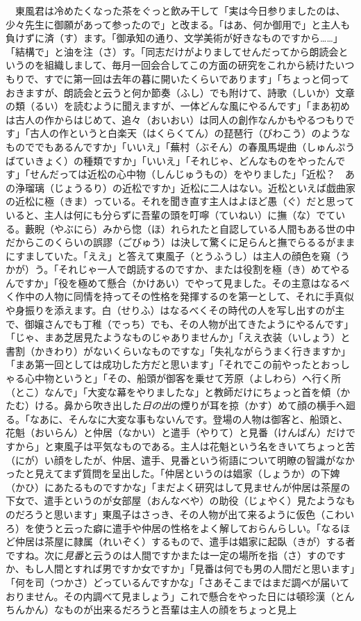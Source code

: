 　東風君は冷めたくなった茶をぐっと飲み干して「実は今日参りましたのは、少々先生に御願があって参ったので」と改まる。「はあ、何か御用で」と主人も負けずに済（す）ます。「御承知の通り、文学美術が好きなものですから\ldots{}\ldots{}」「結構で」と油を注（さ）す。「同志だけがよりましてせんだってから朗読会というのを組織しまして、毎月一回会合してこの方面の研究をこれから続けたいつもりで、すでに第一回は去年の暮に開いたくらいであります」「ちょっと伺っておきますが、朗読会と云うと何か節奏（ふし）でも附けて、詩歌（しいか）文章の類（るい）を読むように聞えますが、一体どんな風にやるんです」「まあ初めは古人の作からはじめて、追々（おいおい）は同人の創作なんかもやるつもりです」「古人の作というと白楽天（はくらくてん）の琵琶行（びわこう）のようなものででもあるんですか」「いいえ」「蕪村（ぶそん）の春風馬堤曲（しゅんぷうばていきょく）の種類ですか」「いいえ」「それじゃ、どんなものをやったんです」「せんだっては近松の心中物（しんじゅうもの）をやりました」「近松？　あの浄瑠璃（じょうるり）の近松ですか」近松に二人はない。近松といえば戯曲家の近松に極（きま）っている。それを聞き直す主人はよほど愚（ぐ）だと思っていると、主人は何にも分らずに吾輩の頭を叮嚀（ていねい）に撫（な）でている。藪睨（やぶにら）みから惚（ほ）れられたと自認している人間もある世の中だからこのくらいの誤謬（ごびゅう）は決して驚くに足らんと撫でらるるがままにすましていた。「ええ」と答えて東風子（とうふうし）は主人の顔色を窺（うかが）う。「それじゃ一人で朗読するのですか、または役割を極（き）めてやるんですか」「役を極めて懸合（かけあい）でやって見ました。その主意はなるべく作中の人物に同情を持ってその性格を発揮するのを第一として、それに手真似や身振りを添えます。白（せりふ）はなるべくその時代の人を写し出すのが主で、御嬢さんでも丁稚（でっち）でも、その人物が出てきたようにやるんです」「じゃ、まあ芝居見たようなものじゃありませんか」「ええ衣装（いしょう）と書割（かきわり）がないくらいなものですな」「失礼ながらうまく行きますか」「まあ第一回としては成功した方だと思います」「それでこの前やったとおっしゃる心中物というと」「その、船頭が御客を乗せて芳原（よしわら）へ行く所（とこ）なんで」「大変な幕をやりましたな」と教師だけにちょっと首を傾（かたむ）ける。鼻から吹き出した\emph{日の出}の煙りが耳を掠（かす）めて顔の横手へ廻る。「なあに、そんなに大変な事もないんです。登場の人物は御客と、船頭と、花魁（おいらん）と仲居（なかい）と遣手（やりて）と見番（けんばん）だけですから」と東風子は平気なものである。主人は花魁という名をきいてちょっと苦（にが）い顔をしたが、仲居、遣手、見番という術語について明瞭の智識がなかったと見えてまず質問を呈出した。「仲居というのは娼家（しょうか）の下婢（かひ）にあたるものですかな」「まだよく研究はして見ませんが仲居は茶屋の下女で、遣手というのが女部屋（おんなべや）の助役（じょやく）見たようなものだろうと思います」東風子はさっき、その人物が出て来るように仮色（こわいろ）を使うと云った癖に遣手や仲居の性格をよく解しておらんらしい。「なるほど仲居は茶屋に隷属（れいぞく）するもので、遣手は娼家に起臥（きが）する者ですね。次に\emph{見番}と云うのは人間ですかまたは一定の場所を指（さ）すのですか、もし人間とすれば男ですか女ですか」「見番は何でも男の人間だと思います」「何を司（つかさ）どっているんですかな」「さあそこまではまだ調べが届いておりません。その内調べて見ましょう」これで懸合をやった日には頓珍漢（とんちんかん）なものが出来るだろうと吾輩は主人の顔をちょっと見上